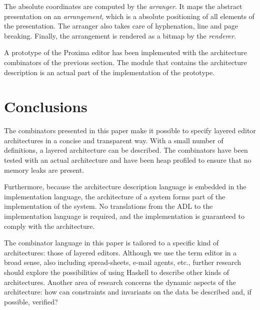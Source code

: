 The absolute coordinates are computed by the {\em arranger}. It maps the abstract presentation on an {\em arrangement}, which is a absolute positioning of all elements of the presentation. The arranger also takes care of hyphenation, line and page breaking. Finally, the arrangement is rendered as a bitmap by the {\em renderer}.

A prototype of the Proxima editor has been implemented with the architecture combinators of the previous section. The module that contains the architecture description is an actual part of the implementation of the prototype.

%																
%																
%																
\section{Conclusions} \label{secthaskellconclusions}

The combinators presented in this paper make it possible to specify layered editor architectures in a concise and transparent way. With a small number of definitions, a layered architecture can be described. The combinators have been tested with an actual architecture and have been heap profiled to ensure that no memory leaks are present.

Furthermore, because the architecture description language is embedded in the implementation language, the architecture of a system forms part of the implementation of the system. No translations from the ADL to the implementation language is required, and the implementation is guaranteed to comply with the architecture.

The combinator language in this paper is tailored to a specific kind of architectures: those of layered editors. Although we use the term editor in a broad sense, also including spread-sheets, e-mail agents, etc., further research should explore the possibilities of using Haskell to describe other kinds of architectures. Another area of research concerns the dynamic aspects of the architecture: how can constraints and invariants on the data be described and, if possible, verified?
